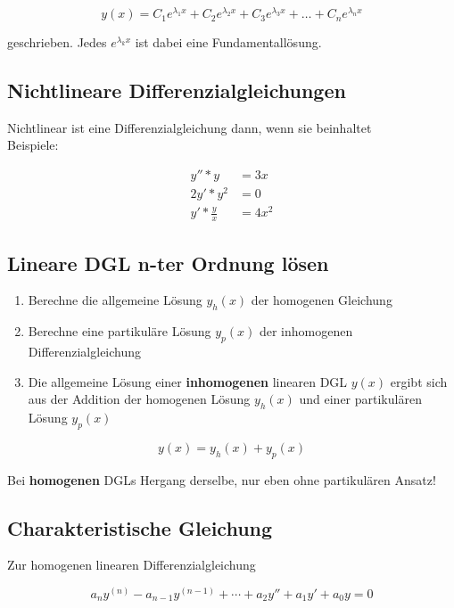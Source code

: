 \documentclass[12pt, a4paper]{scrreprt}
\begin{document}
\[
  y(x) = C_1 e^{\lambda_1 x} + C_2 e^{\lambda_2 x} + C_3 e^{\lambda_3 x} + \dots + C_n e^{\lambda_n x}
\]

geschrieben. Jedes \(e^{\lambda_k x}\) ist dabei eine Fundamentallösung.

\subsection{Nichtlineare Differenzialgleichungen}

Nichtlinear ist eine Differenzialgleichung dann, wenn sie  beinhaltet\\[1em]
Beispiele:

  \begin{align*}
    y''*y &=3x\\
    2y'*y^2 &=0\\
    y'*\frac{y}{x} &= 4x^2
  \end{align*}

\subsection{Lineare DGL n-ter Ordnung lösen}

\begin{enumerate}
\item Berechne die allgemeine Lösung \(y_h(x)\) der homogenen Gleichung
\item Berechne eine partikuläre Lösung \(y_p(x)\) der inhomogenen Differenzialgleichung
\item Die allgemeine Lösung einer \textbf{inhomogenen} linearen DGL \(y(x)\) ergibt sich aus der Addition der homogenen Lösung \(y_h(x)\) und einer partikulären Lösung \(y_p(x)\)
\end{enumerate}

\[
  y(x)=y_h(x)+y_p(x)
\]

Bei \textbf{homogenen} DGLs Hergang derselbe, nur eben ohne partikulären Ansatz!

\subsection{Charakteristische Gleichung}

Zur homogenen linearen Differenzialgleichung

\[
  a_n y^{(n)}-a_{n-1}y^{(n-1)}+ \cdots +a_2y''+a_1y'+a_0y=0
\]
\end{document}
